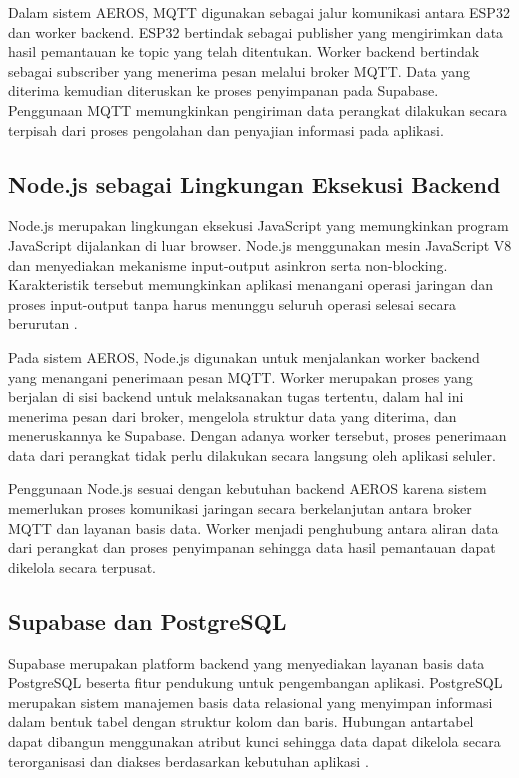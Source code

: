 Dalam sistem AEROS, MQTT digunakan sebagai jalur komunikasi antara ESP32 dan worker backend. ESP32 bertindak sebagai publisher yang mengirimkan data hasil pemantauan ke topic yang telah ditentukan. Worker backend bertindak sebagai subscriber yang menerima pesan melalui broker MQTT. Data yang diterima kemudian diteruskan ke proses penyimpanan pada Supabase. Penggunaan MQTT memungkinkan pengiriman data perangkat dilakukan secara terpisah dari proses pengolahan dan penyajian informasi pada aplikasi.

\subsection{Node.js sebagai Lingkungan Eksekusi Backend}
\label{subsec:NodeJS}

Node.js merupakan lingkungan eksekusi JavaScript yang memungkinkan program JavaScript dijalankan di luar browser. Node.js menggunakan mesin JavaScript V8 dan menyediakan mekanisme input-output asinkron serta non-blocking. Karakteristik tersebut memungkinkan aplikasi menangani operasi jaringan dan proses input-output tanpa harus menunggu seluruh operasi selesai secara berurutan \cite{nodejs_intro}.

Pada sistem AEROS, Node.js digunakan untuk menjalankan worker backend yang menangani penerimaan pesan MQTT. Worker merupakan proses yang berjalan di sisi backend untuk melaksanakan tugas tertentu, dalam hal ini menerima pesan dari broker, mengelola struktur data yang diterima, dan meneruskannya ke Supabase. Dengan adanya worker tersebut, proses penerimaan data dari perangkat tidak perlu dilakukan secara langsung oleh aplikasi seluler.

Penggunaan Node.js sesuai dengan kebutuhan backend AEROS karena sistem memerlukan proses komunikasi jaringan secara berkelanjutan antara broker MQTT dan layanan basis data. Worker menjadi penghubung antara aliran data dari perangkat dan proses penyimpanan sehingga data hasil pemantauan dapat dikelola secara terpusat.

\subsection{Supabase dan PostgreSQL}
\label{subsec:Supabase_PostgreSQL}

Supabase merupakan platform backend yang menyediakan layanan basis data PostgreSQL beserta fitur pendukung untuk pengembangan aplikasi. PostgreSQL merupakan sistem manajemen basis data relasional yang menyimpan informasi dalam bentuk tabel dengan struktur kolom dan baris. Hubungan antartabel dapat dibangun menggunakan atribut kunci sehingga data dapat dikelola secara terorganisasi dan diakses berdasarkan kebutuhan aplikasi \cite{supabase_database}.

